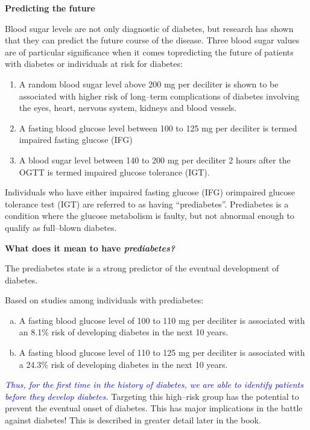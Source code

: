 \noindent
\textbf{Predicting the future}

Blood sugar levels are not only diagnostic of diabetes, but research has shown that they can predict the future course of the disease. Three blood sugar values are of particular significance when it comes to\break predicting the future of patients with diabetes or individuals at risk for diabetes:

\begin{enumerate}
\itemsep=0pt
\item A random blood sugar level above 200 mg per deciliter is shown to be associated with higher risk of long–term complications of diabetes involving the eyes, heart, nervous system, kidneys and blood vessels.
 \item A fasting blood glucose level between 100 to 125 mg per deciliter is termed impaired fasting glucose (IFG)
 \item A blood sugar level between 140 to 200 mg per deciliter 2 hours after the OGTT is termed impaired glucose tolerance (IGT).
 \end{enumerate}

Individuals who have either impaired fasting glucose (IFG) or\break impaired glucose tolerance test (IGT) are referred to as having “prediabetes”. Prediabetes is a condition where the glucose metabolism is faulty, but not abnormal enough to qualify as full–blown diabetes.

\noindent
\textbf{What does it mean to have \textit{prediabetes?}}

The prediabetes state is a strong predictor of the eventual deve\-lopment of diabetes.

Based on studies among individuals with prediabetes:

\begin{enumerate}[a)]
\itemsep=0pt
\item A fasting blood glucose level of 100 to 110 mg per deciliter is asso\-ciated with an 8.1\% risk of developing diabetes in the next 10 years.
 \item A fasting blood glucose level of 110 to 125 mg per deciliter is associated with a 24.3\% risk of developing diabetes in the next 10 years.
 \end{enumerate}

\textcolor{blue}{\textit{Thus, for the first time in the history of diabetes, we are able to identify patients before they develop diabetes.}} Targeting this high–risk group has the potential to prevent the eventual onset of diabetes. This has major implications in the battle against diabetes! This is described in greater detail later in the book.

